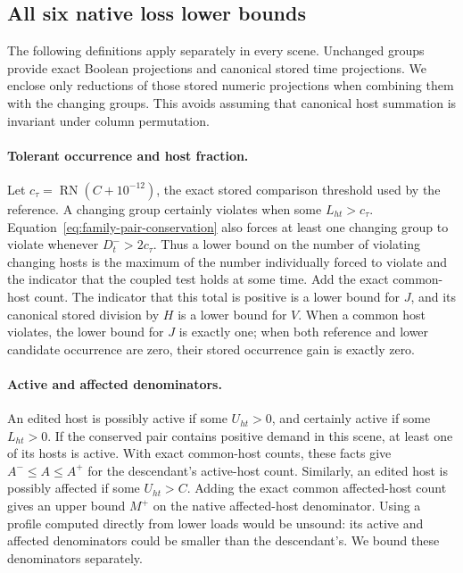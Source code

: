 \documentclass[11pt]{article}
\begin{document}
\subsection{All six native loss lower bounds}

The following definitions apply separately in every scene.  Unchanged groups provide exact Boolean projections and canonical stored time projections.  We enclose only reductions of those stored numeric projections when combining them with the changing groups.  This avoids assuming that canonical host summation is invariant under column permutation.

\paragraph{Tolerant occurrence and host fraction.}
Let $c_\tau=\operatorname{RN}(C+10^{-12})$, the exact stored comparison threshold used by the reference.  A changing group certainly violates when some $L_{ht}>c_\tau$.  Equation~\eqref{eq:family-pair-conservation} also forces at least one changing group to violate whenever $D^-_t>2c_\tau$.  Thus a lower bound on the number of violating changing hosts is the maximum of the number individually forced to violate and the indicator that the coupled test holds at some time.  Add the exact common-host count.  The indicator that this total is positive is a lower bound for $J$, and its canonical stored division by $H$ is a lower bound for $V$.  When a common host violates, the lower bound for $J$ is exactly one; when both reference and lower candidate occurrence are zero, their stored occurrence gain is exactly zero.

\paragraph{Active and affected denominators.}
An edited host is possibly active if some $U_{ht}>0$, and certainly active if some $L_{ht}>0$.  If the conserved pair contains positive demand in this scene, at least one of its hosts is active.  With exact common-host counts, these facts give $A^-\le A\le A^+$ for the descendant's active-host count. Similarly, an edited host is possibly affected if some $U_{ht}>C$.  Adding the exact common affected-host count gives an upper bound $M^+$ on the native affected-host denominator.  Using a profile computed directly from lower loads would be unsound: its active and affected denominators could be smaller than the descendant's.  We bound these denominators separately.
\end{document}
